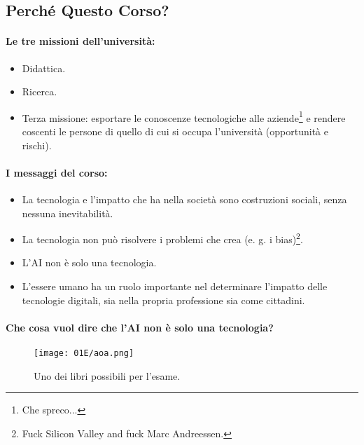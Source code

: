 \subsection{Perché Questo Corso?}

\paragraph{Le tre missioni dell'università:}

\begin{itemize}
  \item Didattica. 
  \item Ricerca. 
  \item Terza missione: esportare le conoscenze tecnologiche alle aziende\footnote{Che spreco...} e rendere coscenti le persone di quello di cui si occupa l'università (opportunità e rischi).
\end{itemize}

\paragraph{I messaggi del corso:}

\begin{itemize}
  \item La tecnologia e l’impatto che ha nella società sono costruzioni sociali,
senza nessuna inevitabilità. 
\item La tecnologia non può risolvere i problemi che crea (e. g. i bias)\footnote{Fuck Silicon Valley and fuck Marc Andreessen.}. 
\item L'AI non è solo una tecnologia. 
\item L'essere umano ha un ruolo importante nel determinare l’impatto delle
tecnologie digitali, sia nella propria professione sia come
cittadini.
\end{itemize}

\paragraph{Che cosa vuol dire che l'AI non è solo una tecnologia?}

\begin{figure}[h]
    \centering
    \texttt{[image: 01E/aoa.png]}
    \caption{Uno dei libri possibili per l'esame.}
\end{figure}

